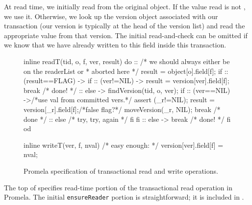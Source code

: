 At read time, we initially read from the original object.  If the
value read is not \FLAG, we use it.  Otherwise, we look up the version
object associated with our transaction (our version is typically at the
head of the version list) and read the appropriate value from that
version.  The initial read-and-check can be omitted if we
know that we have already written to this field inside this transaction.

\begin{figure}
\begin{inlinecode}
inline readT(tid, o, f, ver, result) {
  do
  ::
     /* we should always either be on the readerList or
      * aborted here */
     result = object[o].field[f];
     if
     :: (result==FLAG) ->
        if
        :: (ver!=NIL) ->
           result = version[ver].field[f];
           break /* done! */
        :: else ->
           findVersion(tid, o, ver);
           if
           :: (ver==NIL) ->/*use val from committed vers.*/
              assert (_r!=NIL);
              result = version[_r].field[f];/*false flag?*/
              moveVersion(_r, NIL);
              break /* done */
           :: else /* try, try, again */
           fi
        fi
     :: else -> break /* done! */
     fi
  od
}

inline writeT(ver, f, nval) {
  /* easy enough: */
  version[ver].field[f] = nval;
}
\end{inlinecode}
\caption{Promela specification of transactional read and write operations.}
\label{fig:promrwt}
\end{figure}

The top of  specifies read-time portion of the
transactional read operation in
Promela.  The initial \texttt{ensureReader} portion is
straightforward; it is included in .


